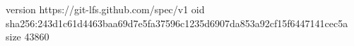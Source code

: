 version https://git-lfs.github.com/spec/v1
oid sha256:243d1c61d4463baa69d7e5fa37596c1235d6907da853a92cf15f6447141cec5a
size 43860
